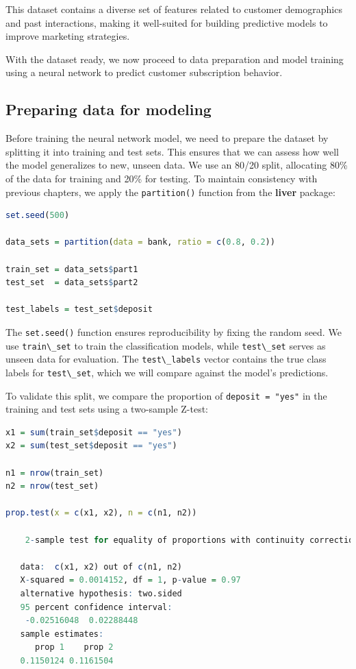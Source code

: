 \documentclass[
]{book}
\newcommand{\passthrough}[1]{#1}
\theoremstyle{definition}
\theoremstyle{definition}
\theoremstyle{definition}
\theoremstyle{definition}
\theoremstyle{remark}
\begin{document}
This dataset contains a diverse set of features related to customer demographics and past interactions, making it well-suited for building predictive models to improve marketing strategies.

With the dataset ready, we now proceed to data preparation and model training using a neural network to predict customer subscription behavior.

\subsection*{Preparing data for modeling}\label{preparing-data-for-modeling-3}

Before training the neural network model, we need to prepare the dataset by splitting it into training and test sets. This ensures that we can assess how well the model generalizes to new, unseen data. We use an 80/20 split, allocating 80\% of the data for training and 20\% for testing. To maintain consistency with previous chapters, we apply the \passthrough{\lstinline!partition()!} function from the \textbf{liver} package:

\begin{lstlisting}[language=R]
set.seed(500)

data_sets = partition(data = bank, ratio = c(0.8, 0.2))

train_set = data_sets$part1
test_set  = data_sets$part2

test_labels = test_set$deposit
\end{lstlisting}

The \passthrough{\lstinline!set.seed()!} function ensures reproducibility by fixing the random seed. We use \passthrough{\lstinline!train\_set!} to train the classification models, while \passthrough{\lstinline!test\_set!} serves as unseen data for evaluation. The \passthrough{\lstinline!test\_labels!} vector contains the true class labels for \passthrough{\lstinline!test\_set!}, which we will compare against the model's predictions.

To validate this split, we compare the proportion of \passthrough{\lstinline!deposit = "yes"!} in the training and test sets using a two-sample Z-test:

\begin{lstlisting}[language=R]
x1 = sum(train_set$deposit == "yes")
x2 = sum(test_set$deposit == "yes")

n1 = nrow(train_set)
n2 = nrow(test_set)

prop.test(x = c(x1, x2), n = c(n1, n2))
   
    2-sample test for equality of proportions with continuity correction
   
   data:  c(x1, x2) out of c(n1, n2)
   X-squared = 0.0014152, df = 1, p-value = 0.97
   alternative hypothesis: two.sided
   95 percent confidence interval:
    -0.02516048  0.02288448
   sample estimates:
      prop 1    prop 2 
   0.1150124 0.1161504
\end{lstlisting}
\end{document}
